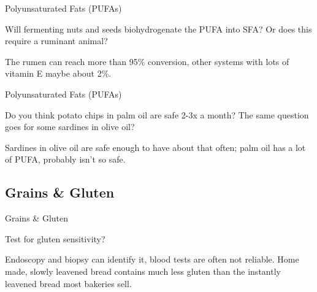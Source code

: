\documentclass[11pt,oneside,openany,extrafontsizes]{memoir}
\begin{document}
\begin{qaexchange}{Polyunsaturated Fats (PUFAs)}

    \begin{question}
        Will fermenting nuts and seeds biohydrogenate the PUFA into SFA? Or does this require a ruminant animal?
    \end{question}

    \begin{answer}
      The rumen can reach more than 95\% conversion, other systems with lots of vitamin E maybe about 2\%.
    \end{answer}
\end{qaexchange}

\begin{qaexchange}{Polyunsaturated Fats (PUFAs)}

    \begin{question}
        Do you think potato chips in palm oil are safe 2-3x a month? The same question goes for some sardines in olive oil?
    \end{question}

    \begin{answer}
      Sardines in olive oil are safe enough to have about that often; palm oil has a lot of PUFA, probably isn't so safe.
    \end{answer}
\end{qaexchange}

\subsection{Grains \& Gluten}

\begin{qaexchange}{Grains \& Gluten}

    \begin{question}
        Test for gluten sensitivity?
    \end{question}

    \begin{answer}
        Endoscopy and biopsy can identify it, blood tests are often not reliable. Home made, slowly leavened bread contains much less gluten than the instantly leavened bread most bakeries sell.
    \end{answer}
\end{qaexchange}
\end{document}
